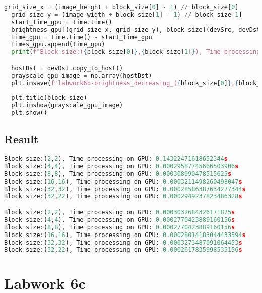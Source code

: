 \documentclass[12pt]{article}
\begin{document}
\begin{lstlisting}[language=Python]
  grid_size_x = (image_height + block_size[0] - 1) // block_size[0]
  grid_size_y = (image_width + block_size[1] - 1) // block_size[1]
  start_time_gpu = time.time()
  brightness_gpu[(grid_size_x, grid_size_y), block_size](devSrc, devDst, threshold, brightness)
  time_gpu = time.time() - start_time_gpu
  times_gpu.append(time_gpu)
  print(f"Block size:({block_size[0]},{block_size[1]}), Time processing on GPU: {time_gpu}s")

  hostDst = devDst.copy_to_host()
  grayscale_gpu_image = np.array(hostDst)
  plt.imsave(f'labwork6b-brightness_decreasing_({block_size[0]},{block_size[1]}).jpg', grayscale_gpu_image, cmap='gray')
  
  plt.title(block_size)
  plt.imshow(grayscale_gpu_image)
  plt.show()
\end{lstlisting}
\subsection{Result}
\begin{lstlisting}[language=Python]
Block size:(2,2), Time processing on GPU: 0.14322471618652344s
Block size:(4,4), Time processing on GPU: 0.00029587745666503906s
Block size:(8,8), Time processing on GPU: 0.000308990478515625s
Block size:(16,16), Time processing on GPU: 0.0003211498260498047s
Block size:(32,32), Time processing on GPU: 0.00028586387634277344s
Block size:(32,22), Time processing on GPU: 0.0002949237823486328s

Block size:(2,2), Time processing on GPU: 0.0003032684326171875s
Block size:(4,4), Time processing on GPU: 0.0002770423889160156s
Block size:(8,8), Time processing on GPU: 0.0002770423889160156s
Block size:(16,16), Time processing on GPU: 0.00028014183044433594s
Block size:(32,32), Time processing on GPU: 0.0003273487091064453s
Block size:(32,22), Time processing on GPU: 0.0002617835998535156s
\end{lstlisting}

\section{Labwork 6c}
\end{document}
